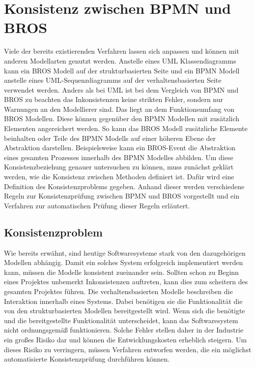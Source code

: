 \chapter{Konsistenz zwischen BPMN und BROS}
\label{chap:consistency}

Viele der bereits existierenden Verfahren lassen sich anpassen und können mit anderen Modellarten genutzt werden. 
Anstelle eines UML Klassendiagramms kann ein BROS Modell auf der strukturbasierten Seite und ein BPMN Modell anstelle eines UML-Sequenzdiagramms auf der verhaltensbasierten Seite verwendet werden.
Anders als bei UML ist bei dem Vergleich von BPMN und BROS zu beachten das Inkonsistenzen keine strikten Fehler, sondern nur Warnungen an den Modellierer sind.
Das liegt an dem Funktionsumfang von BROS Modellen.
Diese können gegenüber den BPMN Modellen mit zusätzlich Elementen angereichert werden.
So kann das BROS Modell zusätzliche Elemente beinhalten oder Teile des BPMN Modells auf einer höheren Ebene der Abstraktion darstellen.
Beispielsweise kann ein BROS-Event die Abstraktion eines gesamten Prozesses innerhalb des BPMN Modelles abbilden.
Um diese Konsistenzbeziehung genauer untersuchen zu können, muss zunächst geklärt werden, wie die Konsistenz zwischen Methoden definiert ist.
Dafür wird eine Definition des Konsistenzproblems gegeben.
Anhand dieser werden verschiedene Regeln zur Konsistenzprüfung zwischen BPMN und BROS vorgestellt und ein Verfahren zur automatischen Prüfung dieser Regeln erläutert.

\section{Konsistenzproblem}

Wie bereits erwähnt, sind heutige Softwaresysteme stark von den dazugehörigen Modellen abhängig.
Damit ein solches System erfolgreich implementiert werden kann, müssen die Modelle konsistent zueinander sein.
Sollten schon zu Beginn eines Projektes unbemerkt Inkonsistenzen auftreten, kann dies zum scheitern des gesamten Projektes führen.
Die verhaltensbasierten Modelle beschreiben die Interaktion innerhalb eines Systems.
Dabei benötigen sie die Funktionalität die von den strukturbasierten Modellen bereitgestellt wird.
Wenn sich die benötigte und die bereitgestellte Funktionalität unterscheidet, kann das Softwaresystem nicht ordnungsgemäß funktionieren.
Solche Fehler stellen daher in der Industrie ein großes Risiko dar und können die Entwicklungskosten erheblich steigern.
Um dieses Risiko zu verringern, müssen Verfahren entworfen werden, die ein möglichst automatisierte Konsistenzprüfung durchführen können.


